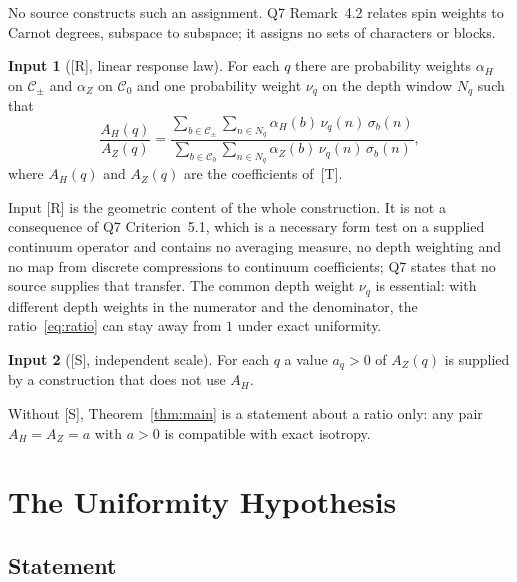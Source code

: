 \documentclass[12pt,a4paper]{article}
\theoremstyle{definition}
\newtheorem*{hypo}{Input}
\theoremstyle{remark}
\newcommand{\Nq}{N_q}
\newcommand{\Cpm}{\mathcal{C}_{\pm}}
\newcommand{\Czero}{\mathcal{C}_{0}}
\begin{document}
      No source constructs such an assignment.
      Q7 Remark~4.2 relates spin weights to Carnot degrees, subspace to subspace; it assigns no sets of characters
      or blocks.

      \begin{hypo}[{[R]}, linear response law]
        For each $q$ there are probability weights $\alpha_H$ on $\Cpm$ and $\alpha_Z$ on $\Czero$ and one probability
        weight $\nu_q$ on the depth window $\Nq$ such that
        \begin{equation}\label{eq:ratio}
          \frac{A_H(q)}{A_Z(q)}
          = \frac{\sum_{b \in \Cpm} \sum_{n \in \Nq} \alpha_H(b)\,\nu_q(n)\,\sigma_b(n)}
                 {\sum_{b \in \Czero} \sum_{n \in \Nq} \alpha_Z(b)\,\nu_q(n)\,\sigma_b(n)},
        \end{equation}
        where $A_H(q)$ and $A_Z(q)$ are the coefficients of~\textup{[T]}.
      \end{hypo}

      Input [R] is the geometric content of the whole construction.
      It is not a consequence of Q7 Criterion~5.1, which is a necessary form test on a supplied continuum operator
      and contains no averaging measure, no depth weighting and no map from discrete compressions to continuum
      coefficients; Q7 states that no source supplies that transfer.
      The common depth weight $\nu_q$ is essential: with different depth weights in the numerator and the
      denominator, the ratio~\eqref{eq:ratio} can stay away from $1$ under exact uniformity.

      \begin{hypo}[{[S]}, independent scale]
        For each $q$ a value $a_q > 0$ of $A_Z(q)$ is supplied by a construction that does not use $A_H$.
      \end{hypo}

      Without [S], Theorem~\ref{thm:main} is a statement about a ratio only: any pair $A_H = A_Z = a$ with $a > 0$ is
      compatible with exact isotropy.

  \section{The Uniformity Hypothesis}\label{sec:universality}

    \subsection{Statement}
\end{document}
